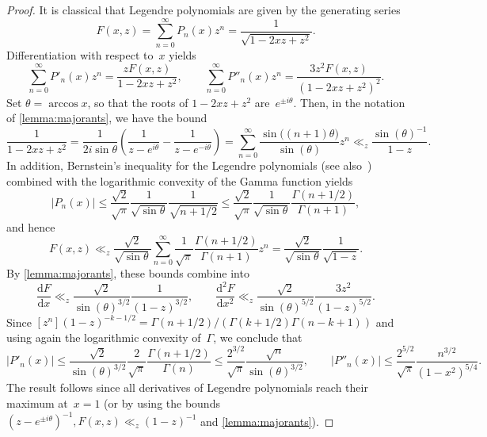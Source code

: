 \documentclass[nohypdvips,review]{siamart0216}
\begin{document}
\begin{proof}
It is classical that Legendre polynomials are given by the generating series
\begin{equation} \label{eq:generating-series}
  F(x, z)
  = \sum_{n=0}^{\infty} P_n(x) z^n
  = \frac{1}{\sqrt{1 - 2 x z + z^2}}.
\end{equation}
Differentiation with respect to~$x$ yields
\[
  \sum_{n=0}^{\infty} P'_n(x) z^n
  = \frac{z F(x, z)}{1 - 2 x z + z^2},
  \qquad
  \sum_{n=0}^{\infty} P''_n(x) z^n
  = \frac{3 z^2 F(x, z)}{(1 - 2 x z + z^2)^2}.
\]
Set $\theta = \arccos x$, so that the roots of $1 - 2 x z + z^2$
are $e^{\pm i \theta}$.
Then, in the notation of \cref{lemma:majorants}, we have the bound
\[ \frac{1}{1 - 2 x z + z^2}
   = \frac{1}{2 i \sin \theta} \left( \frac{1}{z - e^{i \theta}} -
                                      \frac{1}{z - e^{-i \theta}} \right)
   = \sum_{n=0}^{\infty} \frac{\sin\bigl((n+1) \theta\bigr)}{\sin(\theta)} z^n
   \ll_z \frac{\sin(\theta)^{-1}}{1 - z}. \]
In addition, Bernstein's inequality for the Legendre polynomials
\cite{AntonovHolsenikov1980}
(see also~\cite{ChowGatteschiWong1994})
combined with the logarithmic convexity of the Gamma function yields
\[ |P_n(x)| \leq \frac{\sqrt{2}}{\sqrt{\pi}} \frac{1}{\sqrt{\sin \theta}}
                 \frac{1}{\sqrt{n+1/2}}
            \leq \frac{\sqrt 2}{\sqrt{\pi}} \frac{1}{\sqrt{\sin \theta}}
                 \frac{\Gamma(n+1/2)}{\Gamma(n+1)},
\]
and hence
\[ F(x, z) \ll_z \frac{\sqrt{2}}{\sqrt{\sin \theta}}
               \sum_{n=0}^{\infty} \frac{1}{\sqrt{\pi}}
                                  \frac{\Gamma(n+1/2)}{\Gamma(n+1)} z^n
            = \frac{\sqrt{2}}{\sqrt{\sin \theta}}
              \frac{1}{\sqrt{1-z}}. \]
By \cref{lemma:majorants}, these bounds combine into
\[ \frac{\mathrm d F}{\mathrm d x}
   \ll_z \frac{\sqrt{2}}{\sin(\theta)^{3/2}} \frac{1}{(1-z)^{3/2}},
   \qquad
   \frac{\mathrm d^2 F}{\mathrm d x^2}
   \ll_z \frac{\sqrt{2}}{\sin(\theta)^{5/2}} \frac{3 z^2}{(1-z)^{5/2}}. \]
Since
$[z^n] (1 - z)^{- k - 1/2} = \Gamma(n + 1/2)/(\Gamma(k+1/2) \Gamma(n - k + 1))$
and using again the logarithmic convexity of~$\Gamma$, we conclude
that
\[ |P'_n(x)| \leq \frac{\sqrt{2}}{\sin(\theta)^{3/2}}
                  \frac{2}{\sqrt{\pi}} \frac{\Gamma(n+1/2)}{\Gamma(n)}
             \leq \frac{2^{3/2}}{\sqrt{\pi}} \frac{\sqrt n}{\sin(\theta)^{3/2}},
   \qquad
   |P''_n(x)| \leq \frac{2^{5/2}}{\sqrt{\pi}} \frac{n^{3/2}}{(1-x^2)^{5/4}}.
\]
The result follows since all derivatives of Legendre polynomials reach
their maximum at~$x=1$ (or by using the bounds
$(z\!-\!e^{\pm i \theta})^{-1}, F(x, z) \ll_z (1\!-\!z)^{-1}$
and \cref{lemma:majorants}).
\end{proof}
\end{document}
